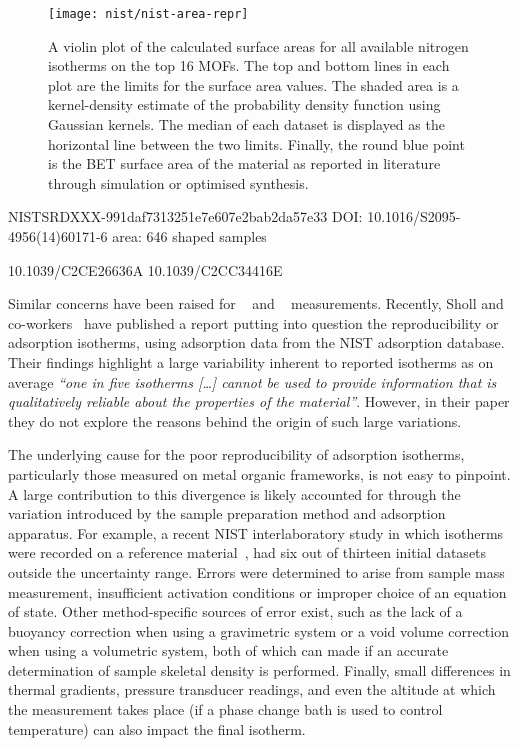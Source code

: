 \begin{figure}[tb]
    \centering
    \texttt{[image: nist/nist-area-repr]}%
    \caption{A violin plot of the calculated surface areas for 
    all available nitrogen isotherms on the top 16 MOFs. 
    The top and bottom lines in each plot are the limits for 
    the surface area values. The shaded area is a kernel-density estimate
    of the probability density function using Gaussian kernels.
    The median of each dataset is displayed as the horizontal line
    between the two limits. Finally, the round blue point is the 
    BET surface area of the material as reported in literature through
    simulation or optimised synthesis.}%
    \label{pyg:fgr:nist-area-repr}
\end{figure}

NISTSRDXXX-991daf7313251e7e607e2bab2da57e33
DOI: 10.1016/S2095-4956(14)60171-6
area: 646
shaped samples

10.1039/C2CE26636A
10.1039/C2CC34416E

Similar concerns have been
raised for ~\cite{broomIrreproducibilityHydrogenStorage2016}
and ~\cite{espinalMeasurementStandardsData2013} measurements.
Recently, Sholl and co-workers~\cite{parkHowReproducibleAre2017}
have published a report putting into question the reproducibility
or adsorption isotherms, using  adsorption data from the 
NIST adsorption database. Their findings highlight a large
variability inherent
to reported isotherms as on average \textit{``one in five  
isotherms [\ldots] cannot be used to provide information that 
is qualitatively reliable about the properties of the material''}.
However, in their paper they do not explore the reasons behind the
origin of such large variations.

The underlying cause for the poor reproducibility of adsorption
isotherms, particularly those measured on metal organic frameworks,
is not easy to pinpoint. A large contribution to this divergence
is likely accounted for through the variation introduced by the
sample preparation method and adsorption apparatus.
For example, a recent NIST interlaboratory study in which  
isotherms were recorded on a reference 
material~\cite{nguyenReferenceHighpressureCO22018}, had six 
out of thirteen initial datasets outside the uncertainty range.
Errors were determined to arise from sample mass measurement,
insufficient activation conditions or improper choice of an 
equation of state. Other method-specific sources of error exist,
such as the lack of a buoyancy correction when using a 
gravimetric system or a void volume correction when using 
a volumetric system, both of which can made if an accurate
determination of sample skeletal density is performed. Finally,
small differences in thermal gradients, pressure transducer
readings, and even the altitude at which the measurement takes place
(if a phase change bath is used to control temperature)
can also impact the final isotherm.

